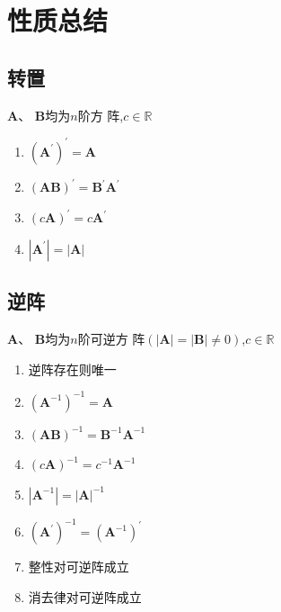 \section{性质总结}
\subsection{转置}
\begin{formal}
\begin{proposition}[转置性质总结]\label{prop:转置性质总结}  
$\bm{A}$、
$\bm{B}$均为$n$阶方
阵,$c \in \mathbb{R}$
\begin{enumerate}[label=\textup{(\arabic*)}]
    \item $\left(\bm{A}^{\prime}\right)^{\prime} = \bm{A}$
    \item $\left(\bm{AB}\right)^{\prime} = 
    \bm{B}^{\prime}\bm{A}^{\prime} $
    \item $\left(c\bm{A}\right)^{\prime} = c\bm{A}^{\prime}$
    \item $\left|\bm{A}^{\prime}\right|
    =\left|\bm{A}\right|$
\end{enumerate}
\end{proposition}
\end{formal}
\subsection{逆阵}
\begin{formal}
\begin{proposition}[逆阵性质总结]\label{prop:逆阵性质总结}
$\bm{A}$、
$\bm{B}$均为$n$阶可逆方
阵$\left(
    \left|\bm{A}\right|
    =\left|\bm{B}\right|
    \neq 0
\right)$,$c \in \mathbb{R}$
\begin{enumerate}[label=\textup{(\arabic*)}]
    \item 逆阵存在则唯一
    \item $ \left(\bm{A}^{-1}\right)^{-1}
    = \bm{A} $
    \item $\left(\bm{AB}\right)^{-1}
    = \bm{B}^{-1}\bm{A}^{-1}$
    \item$\left(c\bm{A}\right)^{-1}
    =c^{-1}\bm{A}^{-1}$
    \item $\left|\bm{A}^{-1}\right|
    = \left|\bm{A}\right|^{-1}$
    \item $\left(\bm{A}^{\prime}\right)^{-1}
    = \left(\bm{A}^{-1}\right)^{\prime}$
    \item 整性对可逆阵成立
    \item 消去律对可逆阵成立
\end{enumerate}
\end{proposition}
\end{formal}
